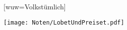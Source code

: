 [wuw={Volkstümlich}]

\markboth{\songtitle}{\songtitle}

\beginverse
\endverse

\centering\texttt{[image: Noten/LobetUndPreiset.pdf]}

\endsong

\beginscripture

\endscripture

\begin{intersong}

\end{intersong}